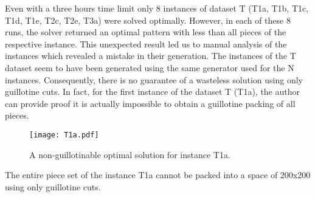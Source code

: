\documentclass[ppgc,tese,english,formais,babel]{iiufrgs}
\begin{document}
\begin{comment}
Instances for which we proved infeasibility:
jl_yMhj5m T1a
jl_meyQRn T1b
jl_IJhWMm T1c
jl_aGVVYp T1d
jl_on4aRl T1e
jl_axD9ro T2c
jl_idk5Cm T2e
jl_61BNyp T3a
\end{comment}

Even with a three hours time limit only 8 instances of dataset T (T1a, T1b, T1c, T1d, T1e, T2c, T2e, T3a) were solved optimally.
However, in each of these 8 runs, the solver returned an optimal pattern with less than all pieces of the respective instance.
This unexpected result led us to manual analysis of the instances which revealed a mistake in their generation.
The instances of the T dataset seem to have been generated using the same generator used for the N instances.
Consequently, there is no guarantee of a wasteless solution using only guillotine cuts.
In fact, for the first instance of the dataset T (T1a), the author can provide proof it is actually impossible to obtain a guillotine packing of all pieces.

\begin{figure}[h]
  \caption{A non-guillotinable optimal solution for instance T1a.}
  \center
  \texttt{[image: T1a.pdf]}
  \label{fig:T1a}
\end{figure}

\begin{proposition}
The entire piece set of the instance T1a cannot be packed into a space of 200x200 using only guillotine cuts.
\end{proposition}
\end{document}
